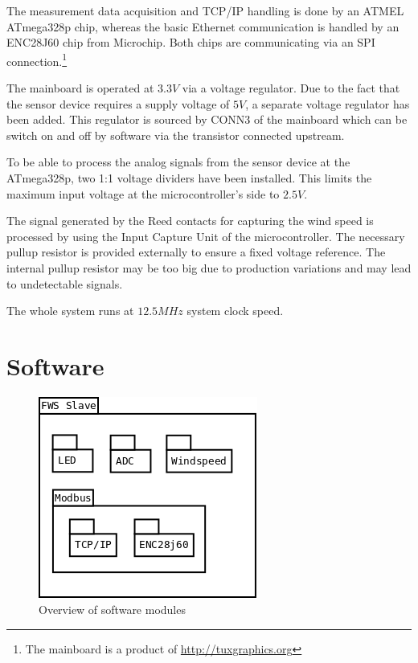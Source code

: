 The measurement data acquisition and TCP/IP handling is done by an ATMEL ATmega328p chip, whereas the basic Ethernet communication is handled by an ENC28J60 chip from Microchip. Both chips are communicating via an SPI connection.\footnote{The mainboard is a product of \url{http://tuxgraphics.org}} 

The mainboard is operated at $3.3 V$ via a voltage regulator. Due to the fact that the sensor device requires a supply voltage of $5 V$, a separate voltage regulator has been added. This regulator is sourced by CONN3 of the mainboard which can be switch on and off by software via the transistor connected upstream.

To be able to process the analog signals from the sensor device at the ATmega328p, two 1:1 voltage dividers have been installed. This limits the maximum input voltage at the microcontroller's side to $2.5 V$.

The signal generated by the Reed contacts for capturing the wind speed is processed by using the Input Capture Unit of the microcontroller. The necessary pullup resistor is provided externally to ensure a fixed voltage reference. The internal pullup resistor may be too big due to production variations and may lead to undetectable signals.

The whole system runs at $12.5 MHz$ system clock speed.

\section{Software}

\begin{figure}[ht]
    \centering
    \includegraphics[width=0.6\linewidth]{graphics/fws_slave.png}
    \caption{Overview of software modules}
    \label{fig:slave_software}
\end{figure}

